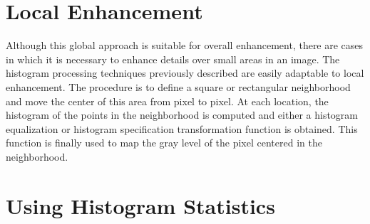 \documentclass{article}
\begin{document}
\section{Local Enhancement}
Although this global approach is suitable for overall enhancement, there are cases in which it is necessary to enhance details over small areas in an image. The histogram processing techniques previously described are easily adaptable to local enhancement. The procedure is to define a square or rectangular neighborhood and move the center of this area from pixel to pixel. At each location, the histogram of the points in the neighborhood is computed and either a histogram equalization or histogram specification transformation function is obtained. This function is finally used to map the gray level of the pixel centered in the neighborhood.
\section{Using Histogram Statistics}











\end{document}
